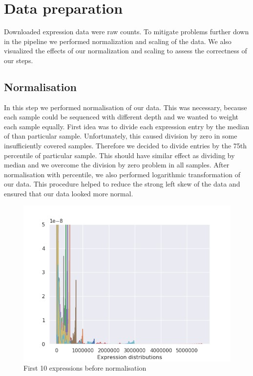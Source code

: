 \section{Data preparation}
Downloaded expression data were raw counts.
To mitigate problems further down in the pipeline we performed normalization and scaling of the data.
We also visualized the effects of our normalization and scaling to assess the correctness of our steps.

\subsection{Normalisation}
In this step we performed normalisation of our data.
This was necessary, because each sample could be sequenced with different depth and we wanted to weight each sample equally.
First idea was to divide each expression entry by the median of than particular sample.
Unfortunately, this caused division by zero in some insufficiently covered samples.
Therefore we decided to divide entries by the 75th percentile of particular sample.
This should have similar effect as dividing by median and we overcome the division by zero problem in all samples.
After normalisation with percentile, we also performed logarithmic transformation of our data.
This procedure helped to reduce the strong left skew of the data and ensured that our data looked more normal.

\begin{figure}
    \centering
    \includegraphics[width=\linewidth]{images/expr_dist.png}
    \caption{First 10 expressions before normalisation}
    \label{fig:expr_dist}
\end{figure}

